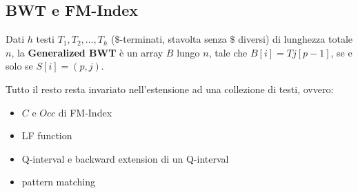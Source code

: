 \documentclass[a4paper,12pt, oneside]{book}
\begin{document}
\subsection{BWT e FM-Index}
\begin{definizione}
  Dati $h$ testi $ T_1,  T_2,  \ldots, T_h$ ($\$$-terminati, stavolta senza $\$$
  diversi) di lunghezza totale $n$, la  \textbf{Generalized  BWT} è un array $B$
  lungo $n$, tale che $B[i] = Tj[p-1]$, se e solo se $S[i] = (p,j)$.
\end{definizione}
Tutto il resto resta invariato nell'estensione ad una collezione di testi,
ovvero: 
\begin{itemize}
  \item $C$ e $Occ$ di FM-Index
  \item LF function
  \item Q-interval e backward extension di un Q-interval
  \item pattern matching
\end{itemize}
\end{document}
